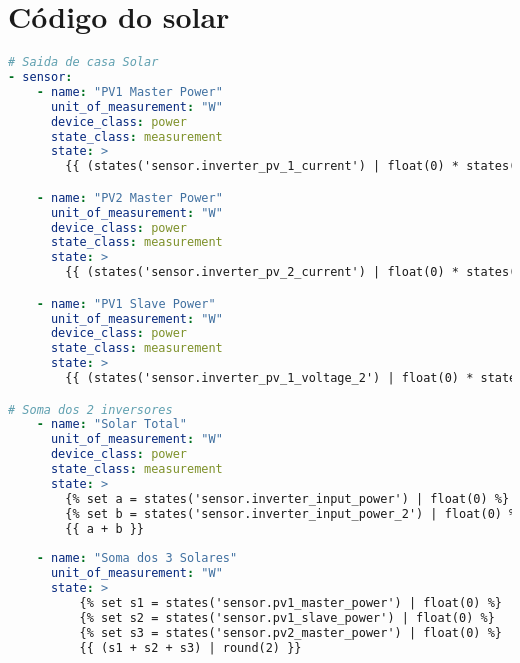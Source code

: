 \section{Código do solar}

\lstset{inputencoding=ascii}
\begin{lstlisting}[language=YAML, caption={conversions.yaml}]
# Saida de casa Solar
- sensor:
    - name: "PV1 Master Power"
      unit_of_measurement: "W"
      device_class: power
      state_class: measurement
      state: >
        {{ (states('sensor.inverter_pv_1_current') | float(0) * states('sensor.inverter_pv_1_voltage') | float(0)) | round(2) }}

    - name: "PV2 Master Power"
      unit_of_measurement: "W"
      device_class: power
      state_class: measurement
      state: >
        {{ (states('sensor.inverter_pv_2_current') | float(0) * states('sensor.inverter_pv_2_voltage') | float(0)) | round(2) }}

    - name: "PV1 Slave Power"
      unit_of_measurement: "W"
      device_class: power
      state_class: measurement
      state: >
        {{ (states('sensor.inverter_pv_1_voltage_2') | float(0) * states('sensor.inverter_pv_1_current_2') | float(0)) | round(2) }}

# Soma dos 2 inversores
    - name: "Solar Total"
      unit_of_measurement: "W"
      device_class: power
      state_class: measurement
      state: >
        {% set a = states('sensor.inverter_input_power') | float(0) %}
        {% set b = states('sensor.inverter_input_power_2') | float(0) %}
        {{ a + b }}
        
    - name: "Soma dos 3 Solares"
      unit_of_measurement: "W"
      state: >
          {% set s1 = states('sensor.pv1_master_power') | float(0) %}
          {% set s2 = states('sensor.pv1_slave_power') | float(0) %}
          {% set s3 = states('sensor.pv2_master_power') | float(0) %}
          {{ (s1 + s2 + s3) | round(2) }}

\end{lstlisting}
